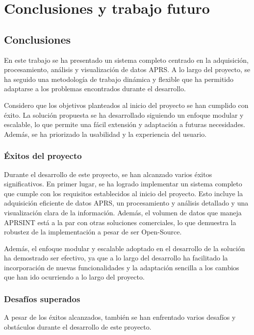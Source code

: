 \chapter{Conclusiones y trabajo futuro}
\label{cap:conclusiones}

\section{Conclusiones}

En este trabajo se ha presentado un sistema completo centrado en la adquisición, procesamiento, análisis y visualización de datos APRS. A lo largo del proyecto, se ha seguido una metodología de trabajo dinámica y flexible que ha permitido adaptarse a los problemas encontrados durante el desarrollo.

Considero que los objetivos planteados al inicio del proyecto se han cumplido con éxito. La solución propuesta se ha desarrollado siguiendo un enfoque modular y escalable, lo que permite una fácil extensión y adaptación a futuras necesidades. Además, se ha priorizado la usabilidad y la experiencia del usuario.

\subsection{Éxitos del proyecto}

Durante el desarrollo de este proyecto, se han alcanzado varios éxitos significativos. En primer lugar, se ha logrado implementar un sistema completo que cumple con los requisitos establecidos al inicio del proyecto. Esto incluye la adquisición eficiente de datos APRS, un procesamiento y análisis detallado y una visualización clara de la información. Además, el volumen de datos que maneja APRSINT está a la par con otras soluciones comerciales, lo que demuestra la robustez de la implementación a pesar de ser Open-Source.

Además, el enfoque modular y escalable adoptado en el desarrollo de la solución ha demostrado ser efectivo, ya que a lo largo del desarrollo ha facilitado la incorporación de nuevas funcionalidades y la adaptación sencilla a los cambios que han ido ocurriendo a lo largo del proyecto. 

\subsection{Desafíos superados}

A pesar de los éxitos alcanzados, también se han enfrentado varios desafíos y obstáculos durante el desarrollo de este proyecto.

